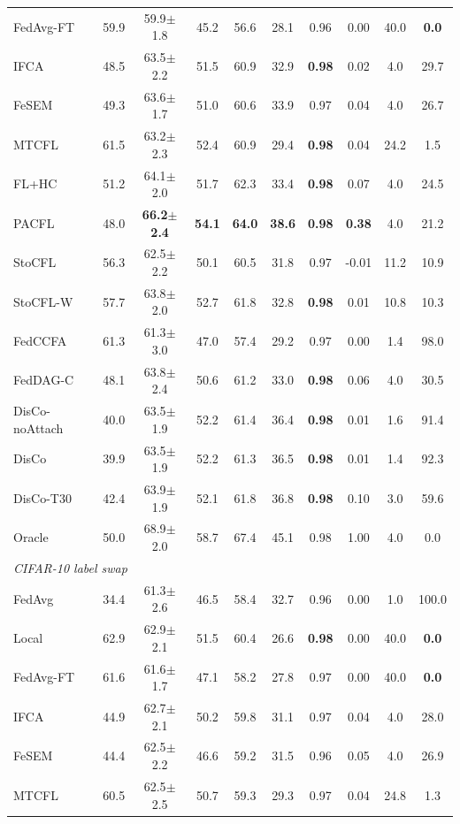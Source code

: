 \begin{tabular}{lccccccccc}
FedAvg-FT & 59.9 & 59.9$\pm$1.8 & 45.2 & 56.6 & 28.1 & 0.96 & 0.00 & 40.0 & \textbf{0.0} \\
IFCA & 48.5 & 63.5$\pm$2.2 & 51.5 & 60.9 & 32.9 & \textbf{0.98} & 0.02 & 4.0 & 29.7 \\
FeSEM & 49.3 & 63.6$\pm$1.7 & 51.0 & 60.6 & 33.9 & 0.97 & 0.04 & 4.0 & 26.7 \\
MTCFL & 61.5 & 63.2$\pm$2.3 & 52.4 & 60.9 & 29.4 & \textbf{0.98} & 0.04 & 24.2 & 1.5 \\
FL+HC & 51.2 & 64.1$\pm$2.0 & 51.7 & 62.3 & 33.4 & \textbf{0.98} & 0.07 & 4.0 & 24.5 \\
PACFL & 48.0 & \textbf{66.2$\pm$2.4} & \textbf{54.1} & \textbf{64.0} & \textbf{38.6} & \textbf{0.98} & \textbf{0.38} & 4.0 & 21.2 \\
StoCFL & 56.3 & 62.5$\pm$2.2 & 50.1 & 60.5 & 31.8 & 0.97 & -0.01 & 11.2 & 10.9 \\
StoCFL-W & 57.7 & 63.8$\pm$2.0 & 52.7 & 61.8 & 32.8 & \textbf{0.98} & 0.01 & 10.8 & 10.3 \\
FedCCFA & 61.3 & 61.3$\pm$3.0 & 47.0 & 57.4 & 29.2 & 0.97 & 0.00 & 1.4 & 98.0 \\
FedDAG-C & 48.1 & 63.8$\pm$2.4 & 50.6 & 61.2 & 33.0 & \textbf{0.98} & 0.06 & 4.0 & 30.5 \\
DisCo-noAttach & 40.0 & 63.5$\pm$1.9 & 52.2 & 61.4 & 36.4 & \textbf{0.98} & 0.01 & 1.6 & 91.4 \\
DisCo & 39.9 & 63.5$\pm$1.9 & 52.2 & 61.3 & 36.5 & \textbf{0.98} & 0.01 & 1.4 & 92.3 \\
DisCo-T30 & 42.4 & 63.9$\pm$1.9 & 52.1 & 61.8 & 36.8 & \textbf{0.98} & 0.10 & 3.0 & 59.6 \\
Oracle & 50.0 & 68.9$\pm$2.0 & 58.7 & 67.4 & 45.1 & 0.98 & 1.00 & 4.0 & 0.0 \\
\midrule
\multicolumn{10}{l}{\textit{CIFAR-10 label swap}}\\
FedAvg & 34.4 & 61.3$\pm$2.6 & 46.5 & 58.4 & 32.7 & 0.96 & 0.00 & 1.0 & 100.0 \\
Local & 62.9 & 62.9$\pm$2.1 & 51.5 & 60.4 & 26.6 & \textbf{0.98} & 0.00 & 40.0 & \textbf{0.0} \\
FedAvg-FT & 61.6 & 61.6$\pm$1.7 & 47.1 & 58.2 & 27.8 & 0.97 & 0.00 & 40.0 & \textbf{0.0} \\
IFCA & 44.9 & 62.7$\pm$2.1 & 50.2 & 59.8 & 31.1 & 0.97 & 0.04 & 4.0 & 28.0 \\
FeSEM & 44.4 & 62.5$\pm$2.2 & 46.6 & 59.2 & 31.5 & 0.96 & 0.05 & 4.0 & 26.9 \\
MTCFL & 60.5 & 62.5$\pm$2.5 & 50.7 & 59.3 & 29.3 & 0.97 & 0.04 & 24.8 & 1.3 \\

\end{tabular}
